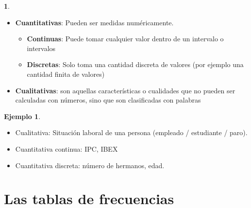 \documentclass[]{article}
\providecommand{\tightlist}{%
  \setlength{\itemsep}{0pt}\setlength{\parskip}{0pt}}
\theoremstyle{plain}
\theoremstyle{definition}
\newtheorem{example}[theorem]{Ejemplo}
\theoremstyle{definition} %
\newcommand{\thistheoremname}{}
\newtheorem{genericthm}[theorem]{\thistheoremname}
\newenvironment{customdef}[1]
  {\renewcommand{\thistheoremname}{#1}%
   \begin{genericthm}}
  {\end{genericthm}}
\begin{document}
\begin{customdef}{Tipos de variables
  estadísticas}

\begin{itemize}
\tightlist
\item
  \textbf{Cuantitativas}: Pueden ser medidas numéricamente.

  \begin{itemize}
  \tightlist
  \item
    \textbf{Continuas}: Puede tomar cualquier valor dentro de un
    intervalo o intervalos
  \item
    \textbf{Discretas}: Solo toma una cantidad discreta de valores (por
    ejemplo una cantidad finita de valores)
  \end{itemize}
\item
  \textbf{Cualitativas}: son aquellas características o cualidades que
  no pueden ser calculadas con números, sino que son clasificadas con
  palabras
\end{itemize}
\end{customdef}

\begin{example}
  
\begin{itemize}
\tightlist
\item
  Cualitativa: Situación laboral de una persona (empleado / estudiante /
  paro).
\item
  Cuantitativa continua: IPC, IBEX
\item
  Cuantitativa discreta: número de hermanos, edad.
\end{itemize}
\end{example}


\section{Las tablas de frecuencias}
\end{document}

